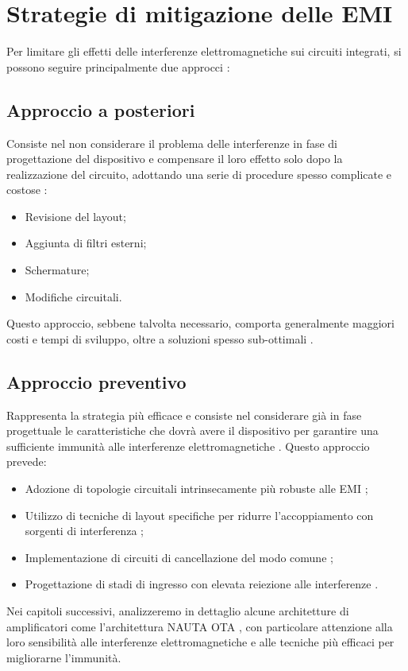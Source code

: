 \section{Strategie di mitigazione delle EMI}
Per limitare gli effetti delle interferenze elettromagnetiche sui circuiti integrati, si possono seguire principalmente due approcci \cite{capitolo2}:

\subsection{Approccio a posteriori}
Consiste nel non considerare il problema delle interferenze in fase di progettazione del dispositivo e compensare il loro effetto solo dopo la realizzazione del circuito, adottando una serie di procedure spesso complicate e costose \cite{capitolo2}:
\begin{itemize}
    \item Revisione del layout;
    \item Aggiunta di filtri esterni;
    \item Schermature;
    \item Modifiche circuitali.
\end{itemize}

Questo approccio, sebbene talvolta necessario, comporta generalmente maggiori costi e tempi di sviluppo, oltre a soluzioni spesso sub-ottimali \cite{Redoute-Richelli_EMC_Magazine}.

\subsection{Approccio preventivo}
Rappresenta la strategia più efficace e consiste nel considerare già in fase progettuale le caratteristiche che dovrà avere il dispositivo per garantire una sufficiente immunità alle interferenze elettromagnetiche \cite{capitolo2}. Questo approccio prevede:
\begin{itemize}
    \item Adozione di topologie circuitali intrinsecamente più robuste alle EMI \cite{An_EMI-Resistant_Common-Mode_Cancelation_Differential_Input_Stage_in_UMC_180_nm_CMOS};
    \item Utilizzo di tecniche di layout specifiche per ridurre l'accoppiamento con sorgenti di interferenza \cite{finalprint};
    \item Implementazione di circuiti di cancellazione del modo comune \cite{An_EMI-Resistant_Common-Mode_Cancelation_Differential_Input_Stage_in_UMC_180_nm_CMOS};
    \item Progettazione di stadi di ingresso con elevata reiezione alle interferenze \cite{Redoute-Richelli_EMC_Magazine}.
\end{itemize}

Nei capitoli successivi, analizzeremo in dettaglio alcune architetture di amplificatori come l'architettura NAUTA OTA \cite{EMI_Immunity_of_the_Nauta_Inverter-Based_Amplifier}, con particolare attenzione alla loro sensibilità alle interferenze elettromagnetiche e alle tecniche più efficaci per migliorarne l'immunità.
